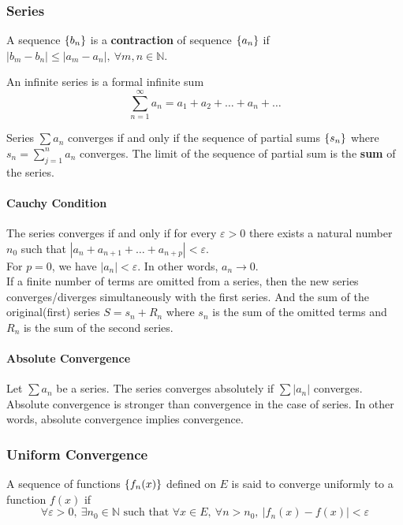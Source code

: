 \subsubsection{Series}
\begin{definition}
	A sequence $\left\{b_n\right\}$ is a \textbf{contraction} of sequence $\left\{a_n\right\}$ if $|b_m-b_n| \le |a_m - a_n|,\ \forall m,n \in \mathbb{N}$.
\end{definition}

\begin{definition}
	An infinite series is a formal infinite sum
	\[ \sum_{n = 1}^\infty a_n = a_1 + a_2 + \dots + a_n + \dots \]
\end{definition}
\begin{definition}
	Series $\sum a_n$ converges if and only if the sequence of partial sums $\left\{s_n\right\}$ where $s_n = \sum_{j=1}^n a_n$ converges.
	The limit of the sequence of partial sum is the \textbf{sum} of the series.
\end{definition}
\paragraph{Cauchy Condition}
The series converges if and only if for every $\varepsilon > 0$ there exists a natural number $n_0$ such that $|a_n + a_{n+1}+\dots+a_{n+p}| < \varepsilon$.\\

For $p=0$, we have $|a_n| < \varepsilon$.
In other words, $a_n \to 0$.\\

If a finite number of terms are omitted from a series, then the new series converges/diverges simultaneously with the first series.
And the sum of the original(first) series $S = s_n + R_n$ where $s_n$ is the sum of the omitted terms and $R_n$ is the sum of the second series.

\paragraph{Absolute Convergence}
Let $\sum a_n$ be a series.
The series converges absolutely if $\sum |a_n|$ converges.
Absolute convergence is stronger than convergence in the case of series.
In other words, absolute convergence implies convergence.

\subsubsection{Uniform Convergence}
\begin{definition}
	A sequence of functions $\left\{f_n(x)\right\}$ defined on $E$ is said to converge uniformly to a function $f(x)$ if
	\[ \forall \varepsilon > 0, \ \exists n_0 \in \mathbb{N} \text{ such that } \forall x \in E,\ \forall n > n_0, \ |f_n(x)-f(x)| < \varepsilon \]
\end{definition}

